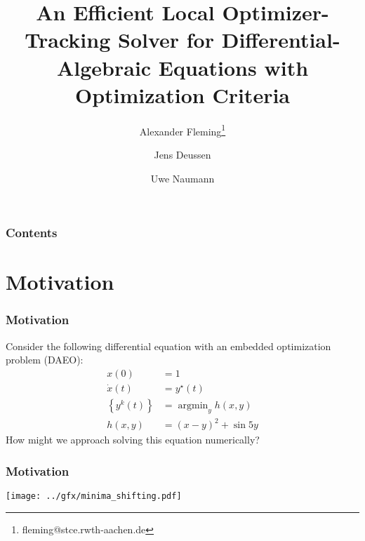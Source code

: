 \documentclass[10pt]{beamer}
\DeclareMathOperator*{\argmin}{\arg\min}
\begin{document}
\title[AD2024, Chicago, Sep 16-19, 2024]{{\bf An Efficient Local Optimizer-Tracking Solver for Differential-Algebraic Equations with Optimization Criteria}}
\author[]{Alexander Fleming\footnote{\scriptsize fleming@stce.rwth-aachen.de} \and Jens Deussen \and Uwe Naumann}
		
\begin{frame}[plain]
\titlepage
\end{frame}

\begin{frame}
	\frametitle{Contents}
	\tableofcontents
\end{frame}

\section{Motivation}

\begin{frame}
\frametitle{Motivation}
\vfill
	Consider the following differential equation with an embedded optimization problem (DAEO):
\begin{equation}
	\label{eq:complicated-example}
	\begin{aligned}
		x(0) &= 1\\
		\dot x(t) &= y^\star(t)\\
		\left\{y^k(t)\right\} &= \argmin_{y} h(x, y)\\
		h(x, y) &= (x-y)^2 + \sin 5y
	\end{aligned}
\end{equation}
\vfill
How might we approach solving this equation numerically?
\vfill
\end{frame}

\begin{frame}
	\frametitle{Motivation}
	\begin{center}
		\texttt{[image: ../gfx/minima\_shifting.pdf]}
	\end{center}
\end{frame}
\end{document}
